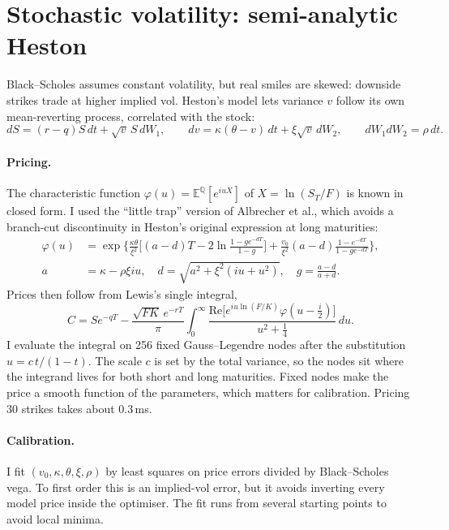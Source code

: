 \documentclass[11pt,a4paper]{article}
\newcommand{\E}{\mathbb{E}}
\newcommand{\Q}{\mathbb{Q}}
\begin{document}
\section{Stochastic volatility: semi-analytic Heston}
Black--Scholes assumes constant volatility, but real smiles are skewed: downside strikes trade at higher implied vol. Heston's model lets variance $v$ follow its own mean-reverting process, correlated with the stock:
\begin{equation}
dS = (r-q)S\,dt + \sqrt v\,S\,dW_1,\qquad dv = \kappa(\theta - v)\,dt + \xi\sqrt v\,dW_2,\qquad dW_1dW_2 = \rho\,dt .
\end{equation}

\paragraph{Pricing.} The characteristic function $\varphi(u) = \E^\Q[e^{iuX}]$ of $X=\ln(S_T/F)$ is known in closed form. I used the ``little trap'' version of Albrecher et al., which avoids a branch-cut discontinuity in Heston's original expression at long maturities:
\begin{align}
\varphi(u) &= \exp\!\Big\{\tfrac{\kappa\theta}{\xi^2}\Big[(a-d)T - 2\ln\tfrac{1-ge^{-dT}}{1-g}\Big] + \tfrac{v_0}{\xi^2}(a-d)\tfrac{1-e^{-dT}}{1-ge^{-dT}}\Big\},\\
a &= \kappa - \rho\xi iu,\quad d = \sqrt{a^2 + \xi^2(iu+u^2)},\quad g = \tfrac{a-d}{a+d}. \nonumber
\end{align}
Prices then follow from Lewis's single integral,
\begin{equation}
C = Se^{-qT} - \frac{\sqrt{FK}\,e^{-rT}}{\pi}\int_0^\infty \frac{\mathrm{Re}\big[e^{iu\ln(F/K)}\varphi(u - \tfrac i2)\big]}{u^2+\tfrac14}\,du .
\end{equation}
I evaluate the integral on 256 fixed Gauss--Legendre nodes after the substitution $u = c\,t/(1-t)$. The scale $c$ is set by the total variance, so the nodes sit where the integrand lives for both short and long maturities. Fixed nodes make the price a smooth function of the parameters, which matters for calibration. Pricing 30 strikes takes about 0.3\,ms.

\paragraph{Calibration.} I fit $(v_0,\kappa,\theta,\xi,\rho)$ by least squares on price errors divided by Black--Scholes vega. To first order this is an implied-vol error, but it avoids inverting every model price inside the optimiser. The fit runs from several starting points to avoid local minima.
\end{document}

